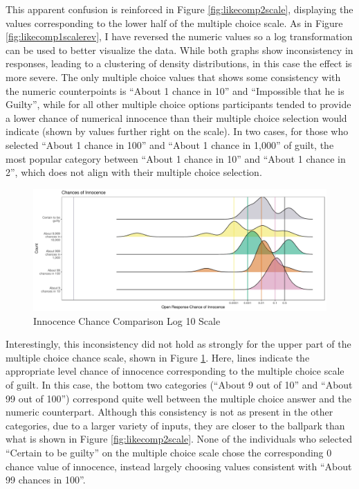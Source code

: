 \documentclass[print]{nuthesis}
\begin{document}
This apparent confusion is reinforced in Figure \ref{fig:likecomp2scale}, displaying the values corresponding to the lower half of the multiple choice scale.
As in Figure \ref{fig:likecomp1scalerev}, I have reversed the numeric values so a log transformation can be used to better visualize the data.
While both graphs show inconsistency in responses, leading to a clustering of density distributions, in this case the effect is more severe.
The only multiple choice values that shows some consistency with the numeric counterpoints is ``About 1 chance in 10'' and ``Impossible that he is Guilty'', while for all other multiple choice options participants tended to provide a lower chance of numerical innocence than their multiple choice selection would indicate (shown by values further right on the scale).
In two cases, for those who selected ``About 1 chance in 100'' and ``About 1 chance in 1,000'' of guilt, the most popular category between ``About 1 chance in 10'' and ``About 1 chance in 2'', which does not align with their multiple choice selection.

\begin{figure}

{\centering \includegraphics[width=\linewidth]{thesis_files/figure-latex/likecomp2scalerev-1} 

}

\caption{Innocence Chance Comparison Log 10 Scale}\label{fig:likecomp2scalerev}
\end{figure}

Interestingly, this inconsistency did not hold as strongly for the upper part of the multiple choice chance scale, shown in Figure \ref{fig:likecomp2scalerev}.
Here, lines indicate the appropriate level chance of innocence corresponding to the multiple choice scale of guilt.
In this case, the bottom two categories (``About 9 out of 10'' and ``About 99 out of 100'') correspond quite well between the multiple choice answer and the numeric counterpart.
Although this consistency is not as present in the other categories, due to a larger variety of inputs, they are closer to the ballpark than what is shown in Figure \ref{fig:likecomp2scale}.
None of the individuals who selected ``Certain to be guilty'' on the multiple choice scale chose the corresponding 0 chance value of innocence, instead largely choosing values consistent with ``About 99 chances in 100''.
\end{document}
